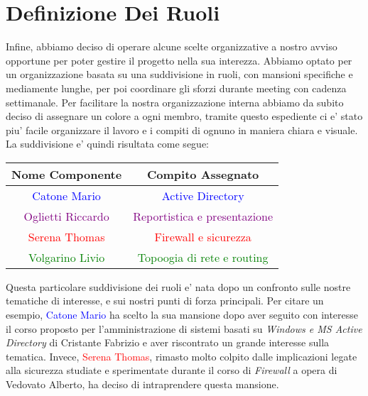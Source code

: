 \documentclass{report}
\begin{document}
        \section{Definizione Dei Ruoli}
            Infine, abbiamo deciso di operare alcune scelte organizzative a nostro avviso opportune per poter gestire il
             progetto nella sua interezza. Abbiamo optato per un organizzazione basata su una suddivisione in ruoli, con
             mansioni specifiche e mediamente lunghe, per poi coordinare gli sforzi durante meeting con cadenza settimanale.
            Per facilitare la nostra organizzazione interna abbiamo da subito deciso di assegnare un colore a ogni membro,
             tramite questo espediente ci e' stato piu' facile organizzare il lavoro e i compiti di ognuno in maniera chiara
             e visuale. 
            La suddivisione e' quindi risultata come segue: 
            \begin{center}
                \begin{tabular}{ |c|c| }
                    \hline
                    Nome Componente & Compito Assegnato \\
                    \hline \hline
                    \textcolor{Blue}{Catone Mario} & \textcolor{Blue}{Active Directory} \\
                    \hline
                    \textcolor{Purple}{Oglietti Riccardo} & \textcolor{Purple}{Reportistica e presentazione} \\
                    \hline
                    \textcolor{Red}{Serena Thomas} & \textcolor{Red}{Firewall e sicurezza} \\
                    \hline
                    \textcolor{Green}{Volgarino Livio} & \textcolor{Green}{Topoogia di rete e routing} \\
                    \hline
                \end{tabular}
            \end{center}
            Questa particolare suddivisione dei ruoli e' nata dopo un confronto sulle nostre tematiche di interesse, e sui
             nostri punti di forza principali. Per citare un esempio, \textcolor{Blue}{Catone Mario} ha scelto la sua mansione
             dopo aver seguito con interesse il corso proposto per l'amministrazione di sistemi basati su \emph{Windows e MS
             Active Directory} di Cristante Fabrizio e aver riscontrato un grande interesse sulla tematica. Invece,
             \textcolor{Red}{Serena Thomas}, rimasto molto colpito dalle implicazioni legate alla sicurezza studiate e
             sperimentate durante il corso di \emph{Firewall} a opera di Vedovato Alberto, ha deciso di intraprendere
             questa mansione.
\end{document}
